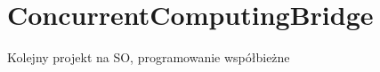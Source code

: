 \chapter{Concurrent\+Computing\+Bridge}
\hypertarget{md__r_e_a_d_m_e}{}\label{md__r_e_a_d_m_e}
\label{md__r_e_a_d_m_e_autotoc_md0}%
%
Kolejny projekt na SO, programowanie współbieżne~\newline
  